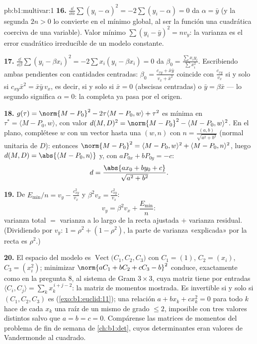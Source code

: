 \begin{solution}{pb:b1:multivar:1}
\textbf{16.} $\frac{\dd}{\dd\alpha}\sum(y_i - \alpha)^2 =
-2\sum(y_i - \alpha) = 0$ da $\alpha = \bar y$ (y la
 segunda $2n > 0$ lo convierte en el mínimo global, al ser la
función una cuadrática coerciva de una variable). Valor
mínimo $\sum(y_i - \bar y)^2 = n v_y$: la varianza es el
error cuadrático irreducible de un modelo constante.

\textbf{17.} $\frac{\dd}{\dd\beta}\sum(y_i - \beta x_i)^2 =
-2\sum x_i(y_i - \beta x_i) = 0$ da $\beta_0 = \frac{\sum
x_iy_i}{\sum x_i^2}$. Escribiendo ambas pendientes con cantidades
centradas: $\beta_0 = \frac{c_{xy} + \bar x\bar y}{v_x + \bar
x^2}$ coincide con $\frac{c_{xy}}{v_x}$ si y solo si $c_{xy}\bar x^2 = \bar
x\bar y\,v_x$, es decir, si y solo si $\bar x = 0$ (abscisas centradas) o
$\bar y = \beta\bar x$ --- lo segundo significa $\alpha = 0$: la
 completa ya pasa por el origen.

\textbf{18.} $g(\tau) = \norm{M - P_0}^2 - 2\tau\langle M - P_0,
w\rangle + \tau^2$ es mínima en $\tau^* = \langle M - P_0,
w\rangle$, con valor $d(M,D)^2 = \norm{M - P_0}^2 - \langle M -
P_0, w\rangle^2$. En el plano, complétese $w$ con un vector 
hasta una   $(w, n)$ con $n = \frac{(a, b)}{\sqrt{a^2+b^2}}$ (normal
unitaria de $D$): entonces $\norm{M - P_0}^2 = \langle M - P_0,
w\rangle^2 + \langle M - P_0, n\rangle^2$, luego $d(M, D) =
\abs{\langle M - P_0, n\rangle}$ y, con $aP_{0x} + bP_{0y} =
-c$:
\[
d = \frac{\abs{a x_0 + b y_0 + c}}{\sqrt{a^2 + b^2}} .
\]

\textbf{19.} De $E_{\min}/n = v_y - \frac{c_{xy}^2}{v_x}$ y
$\beta^2 v_x = \frac{c_{xy}^2}{v_x}$:
\[
v_y = \beta^2 v_x + \frac{E_{\min}}n :
\]
varianza total $=$ varianza a lo largo de la recta ajustada $+$ varianza
residual. (Dividiendo por $v_y$: $1 = \rho^2 + (1 - \rho^2)$, la
parte de varianza «explicada» por la recta es $\rho^2$.)

\textbf{20.} El espacio del modelo es
$\operatorname{Vect}\bigl(C_1, C_2, C_3\bigr)$ con $C_1 = (1)$,
$C_2 = (x_i)$, $C_3 = (x_i^2)$; minimizar $\norm{aC_1 + bC_2 +
cC_3 - b}^2$ conduce, exactamente como en la pregunta 8, al sistema de
Gram $3\times3$, cuya matriz tiene por entradas $\langle C_i, C_j\rangle =
\sum_k x_k^{\,i+j-2}$: la matriz de momentos mostrada. Es
invertible si y solo si $(C_1, C_2, C_3)$ es 
(\cref{exo:b1:euclid:11}); una relación $a + bx_k + cx_k^2 = 0$
para todo $k$ hace de cada $x_k$ una raíz de un mismo  de
grado $\leq 2$, imposible con tres valores distintos salvo que $a
= b = c = 0$. Compárense las matrices de momentos del problema de fin de semana
de \cref{ch:b1:det}, cuyos determinantes eran valores de
Vandermonde al cuadrado.


\end{solution}
